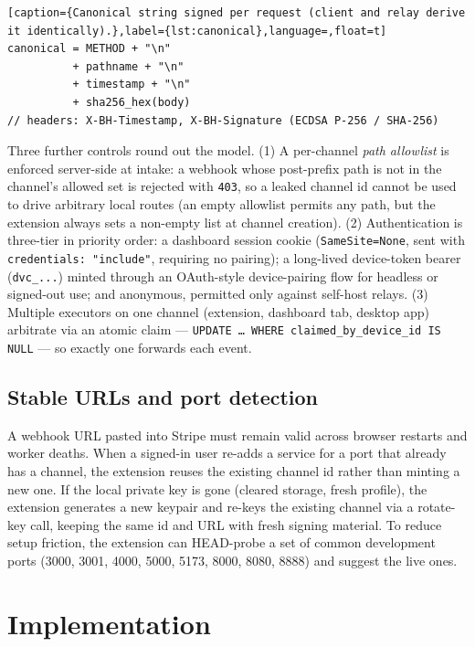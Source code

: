 \documentclass[11pt]{article}
\begin{document}
\begin{lstlisting}[caption={Canonical string signed per request (client and relay derive it identically).},label={lst:canonical},language=,float=t]
canonical = METHOD + "\n"
          + pathname + "\n"
          + timestamp + "\n"
          + sha256_hex(body)
// headers: X-BH-Timestamp, X-BH-Signature (ECDSA P-256 / SHA-256)
\end{lstlisting}

Three further controls round out the model. (1) A per-channel \emph{path
allowlist} is enforced server-side at intake: a webhook whose post-prefix path
is not in the channel's allowed set is rejected with \texttt{403}, so a leaked
channel id cannot be used to drive arbitrary local routes (an empty allowlist
permits any path, but the extension always sets a non-empty list at channel
creation). (2) Authentication
is three-tier in priority order: a dashboard session cookie
(\texttt{SameSite=None}, sent with \texttt{credentials: "include"}, requiring no
pairing); a long-lived device-token bearer (\texttt{dvc\_...}) minted through an
OAuth-style device-pairing flow for headless or signed-out use; and anonymous,
permitted only against self-host relays. (3) Multiple executors on one channel
(extension, dashboard tab, desktop app) arbitrate via an atomic claim ---
\texttt{UPDATE \ldots\ WHERE claimed\_by\_device\_id IS NULL} --- so exactly one
forwards each event.

\subsection{Stable URLs and port detection}
\label{sec:stable}

A webhook URL pasted into Stripe must remain valid across browser restarts and
worker deaths. When a signed-in user re-adds a service for a port that already
has a channel, the extension reuses the existing channel id rather than minting
a new one. If the local private key is gone (cleared storage, fresh profile),
the extension generates a new keypair and re-keys the existing channel via a
rotate-key call, keeping the same id and URL with fresh signing material. To
reduce setup friction, the extension can HEAD-probe a set of common development
ports (3000, 3001, 4000, 5000, 5173, 8000, 8080, 8888) and suggest the live
ones.

\section{Implementation}
\label{sec:impl}
\end{document}
